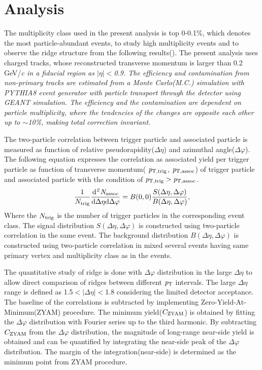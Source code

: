 \documentclass[ALICE,manyauthors]{cernphprep}
\begin{document}
\section{Analysis}

The multiplicity class used in the present analysis is top 0-0.1\%, which denotes the most particle-abundant events, to study high multiplicity events and to observe the ridge structure from the following results(\cite{ridge_pp_1}). The present analysis uses charged tracks, whose reconstructed transverse momentum is larger than 0.2 GeV/\it{c}\rm{} in a fiducial region as $|\eta|<$0.9. The efficiency and contamination from non-primary tracks are estimated from a Monte Carlo(M.C.) simulation with PYTHIA8 event generator with particle transport through the detector using GEANT simulation. The efficiency and the contamination are dependent on particle multiplicity, where the tendencies of the changes are opposite each other up to $\sim$10\%, making total correction invariant.

The two-particle correlation between trigger particle and associated particle is measured as function of relative pseudorapidity($\Delta\eta$) and azimuthal angle($\Delta\varphi$). The following equation expresses the correlation as associated yield per trigger particle as function of transverse momentum( $\it{p}_{\rm{T, trig}}$, $\it{p}_{\rm{T, assoc}}$) of trigger particle and associated particle with the condition of $\it{p}_{\rm{T, trig}} > \it{p}_{\rm{T, assoc}}$.
\begin{eqnarray}
\frac{1}{N_{\rm{trig}}} \frac{ \rm{d}\it{}^{2} N_{\rm{assoc}} }{ \rm{d}\Delta\eta \rm{d}\Delta\varphi} = B(0, 0)\frac{S(\Delta\eta, \Delta\varphi)}{B(\Delta\eta, \Delta\varphi)},
\end{eqnarray}
Where the $N_{\rm{trig}}$ is the number of trigger particles in the corresponding event class. The signal distribution $S(\Delta\eta, \Delta\varphi)$ is constructed using two-particle correlation in the same event. The background distribution $B(\Delta\eta, \Delta\varphi)$ is constructed using two-particle correlation in mixed several events having same primary vertex and multiplicity class as in the events.

The quantitative study of ridge is done with $\Delta\varphi$ distribution in the large $\Delta\eta$ to allow direct comparison of ridges between different $\it{p}_{\rm{T}}$ intervals. The large $\Delta\eta$ range is defined as 1.5$<|\Delta\eta|<$1.8 considering the limited detector acceptance. The baseline of the correlations is subtracted by implementing Zero-Yield-At-Minimum(ZYAM) procedure. The minimum yield($C_{\rm{ZYAM}}$) is obtained by fitting the $\Delta\varphi$ distribution with Fourier series up to the third harmonic. By subtracting $C_{\rm{ZYAM}}$ from the $\Delta\varphi$ distribution, the magnitude of long-range near-side yield is obtained and can be quantified by integrating the near-side peak of the $\Delta\varphi$ distribution. The margin of the integration(near-side) is determined as the minimum point from ZYAM procedure.
\end{document}
